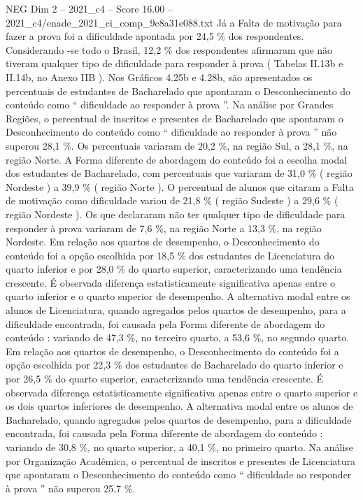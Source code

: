 \begin{textsample}{NEG Dim 2 – 2021\_c4 – Score 16.00 – 2021\_c4/enade\_2021\_ci\_comp\_9c8a31e088.txt}
Já a Falta de motivação para fazer a prova foi a dificuldade apontada por 24,5 \% dos respondentes.
Considerando -se todo o Brasil, 12,2 \% dos respondentes afirmaram que não tiveram qualquer tipo de dificuldade para responder à prova ( Tabelas II.13b e II.14b, no Anexo IIB ).
Nos Gráficos 4.25b e 4.28b, são apresentados os percentuais de estudantes de Bacharelado que apontaram o Desconhecimento do conteúdo como “ dificuldade ao responder à prova ”.
Na análise por Grandes Regiões, o percentual de inscritos e presentes de Bacharelado que apontaram o Desconhecimento do conteúdo como “ dificuldade ao responder à prova ” não superou 28,1 \%.
Os percentuais variaram de 20,2 \%, na região Sul, a 28,1 \%, na região Norte.
A Forma diferente de abordagem do conteúdo foi a escolha modal dos estudantes de Bacharelado, com percentuais que variaram de 31,0 \% ( região Nordeste ) a 39,9 \% ( região Norte ).
O percentual de alunos que citaram a Falta de motivação como dificuldade variou de 21,8 \% ( região Sudeste ) a 29,6 \% ( região Nordeste ).
Os que declararam não ter qualquer tipo de dificuldade para responder à prova variaram de 7,6 \%, na região Norte a 13,3 \%, na região Nordeste.
Em relação aos quartos de desempenho, o Desconhecimento do conteúdo foi a opção escolhida por 18,5 \% dos estudantes de Licenciatura do quarto inferior e por 28,0 \% do quarto superior, caracterizando uma tendência crescente.
É observada diferença estatisticamente significativa apenas entre o quarto inferior e o quarto superior de desempenho.
A alternativa modal entre os alunos de Licenciatura, quando agregados pelos quartos de desempenho, para a dificuldade encontrada, foi causada pela Forma diferente de abordagem do conteúdo : variando de 47,3 \%, no terceiro quarto, a 53,6 \%, no segundo quarto.
Em relação aos quartos de desempenho, o Desconhecimento do conteúdo foi a opção escolhida por 22,3 \% dos estudantes de Bacharelado do quarto inferior e por 26,5 \% do quarto superior, caracterizando uma tendência crescente.
É observada diferença estatisticamente significativa apenas entre o quarto superior e os dois quartos inferiores de desempenho.
A alternativa modal entre os alunos de Bacharelado, quando agregados pelos quartos de desempenho, para a dificuldade encontrada, foi causada pela Forma diferente de abordagem do conteúdo : variando de 30,8 \%, no quarto superior, a 40,1 \%, no primeiro quarto.
Na análise por Organização Acadêmica, o percentual de inscritos e presentes de Licenciatura que apontaram o Desconhecimento do conteúdo como “ dificuldade ao responder à prova ” não superou 25,7 \%.

\end{textsample}
